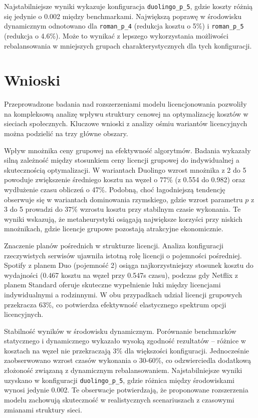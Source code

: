 Najstabilniejsze wyniki wykazuje konfiguracja \texttt{duolingo\_p\_5}, gdzie koszty różnią się jedynie o 0.002 między benchmarkami. Największą poprawę w środowisku dynamicznym odnotowano dla \texttt{roman\_p\_4} (redukcja kosztu o 5\%) i \texttt{roman\_p\_5} (redukcja o 4.6\%). Może to wynikać z lepszego wykorzystania możliwości rebalansowania w mniejszych grupach charakterystycznych dla tych konfiguracji.
\section{Wnioski}

Przeprowadzone badania nad rozszerzeniami modelu licencjonowania pozwoliły na kompleksową analizę wpływu struktury cenowej na optymalizację kosztów w sieciach społecznych. Kluczowe wnioski z analizy ośmiu wariantów licencyjnych można podzielić na trzy główne obszary.

Wpływ mnożnika ceny grupowej na efektywność algorytmów. Badania wykazały silną zależność między stosunkiem ceny licencji grupowej do indywidualnej a skutecznością optymalizacji. W wariantach Duolingo wzrost mnożnika z 2 do 5 powoduje zwiększenie średniego kosztu na węzeł o 77\% (z 0.554 do 0.982) oraz wydłużenie czasu obliczeń o 47\%. Podobną, choć łagodniejszą tendencję obserwuje się w wariantach dominowania rzymskiego, gdzie wzrost parametru $p$ z 3 do 5 prowadzi do 37\% wzrostu kosztu przy stabilnym czasie wykonania. Te wyniki wskazują, że metaheurystyki osiągają największe korzyści przy niskich mnożnikach, gdzie licencje grupowe pozostają atrakcyjne ekonomicznie.

Znaczenie planów pośrednich w strukturze licencji. Analiza konfiguracji rzeczywistych serwisów ujawniła istotną rolę licencji o pojemności pośredniej. Spotify z planem Duo (pojemność 2) osiąga najkorzystniejszy stosunek kosztu do wydajności (0.467 kosztu na węzeł przy 0.547s czasu), podczas gdy Netflix z planem Standard oferuje skuteczne wypełnienie luki między licencjami indywidualnymi a rodzinnymi. W obu przypadkach udział licencji grupowych przekracza 63\%, co potwierdza efektywność elastycznego spektrum opcji licencyjnych.

Stabilność wyników w środowisku dynamicznym. Porównanie benchmarków statycznego i dynamicznego wykazało wysoką zgodność rezultatów -- różnice w kosztach na węzeł nie przekraczają 3\% dla większości konfiguracji. Jednocześnie zaobserwowano wzrost czasów wykonania o 30-60\%, co odzwierciedla dodatkową złożoność związaną z dynamicznym rebalansowaniem. Najstabilniejsze wyniki uzyskano w konfiguracji \texttt{duolingo\_p\_5}, gdzie różnica między środowiskami wynosi jedynie 0.002. Te obserwacje potwierdzają, że proponowane rozszerzenia modelu zachowują skuteczność w realistycznych scenariuszach z czasowymi zmianami struktury sieci.

